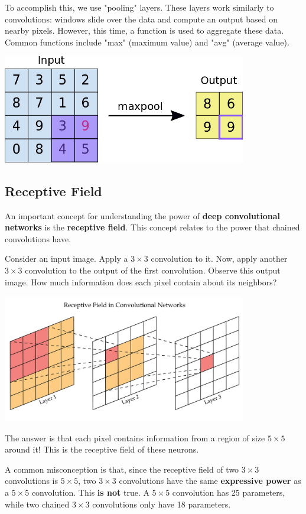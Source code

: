 To accomplish this, we use "pooling" layers. These layers work similarly to convolutions: windows slide over the data and compute an output based on nearby pixels. However, this time, a function is used to aggregate these data. Common functions include "max" (maximum value) and "avg" (average value).

\begin{center}
\includegraphics[width=0.8\textwidth]{figuras/max_pool.png}
\end{center}

\subsection{Receptive Field}

An important concept for understanding the power of \textbf{deep convolutional networks} is the \textbf{receptive field}. This concept relates to the power that chained convolutions have.

Consider an input image. Apply a \( 3 \times 3 \) convolution to it. Now, apply another \( 3 \times 3 \) convolution to the output of the first convolution. Observe this output image. How much information does each pixel contain about its neighbors?

\begin{center}
\includegraphics[width=0.8\textwidth]{figuras/receptive_field.png}
\end{center}

The answer is that each pixel contains information from a region of size \( 5 \times 5 \) around it! This is the receptive field of these neurons.

A common misconception is that, since the receptive field of two \( 3 \times 3 \) convolutions is \( 5 \times 5 \), two \( 3 \times 3 \) convolutions have the same \textbf{expressive power} as a \( 5 \times 5 \) convolution. This \textbf{is not} true. A \( 5 \times 5 \) convolution has 25 parameters, while two chained \( 3 \times 3 \) convolutions only have 18 parameters.





